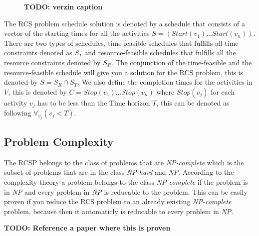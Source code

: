\documentclass{article}
\newcommand{\TODO}[1]{{\color{red}\textbf{TODO: #1}}}
\newcommand{\start}[1]{\textit{Start}(#1)} %
\begin{document}
\begin{figure}[h]
	\centering
	
	\caption{\TODO{verzin caption}}
	\label{fig:time_schedule}
\end{figure}

The RCS problem schedule solution is denoted by a schedule that consists of a vector of the starting times for all the activities $S =  (\start{v_1} \ldots \start{v_n})$.
There are two types of schedules, time-feasible schedules that fulfills all time constraints denoted as $S_T$ and resource-feasible schedules that fulfills all the resource constraints denoted by $S_R$.
The conjunction of the time-feasible and the resource-feasible schedule will give you a solution for the RCS problem, this is denoted by $S = S_R \cap S_T$.
We also define the completion times for the activities in $V$, this is denoted by $C = Stop(v_1) \ldots Stop(v_n)$ where $Stop(v_j)$ for each activity $v_j$ has to be less than the Time horizon $T$, this can be denoted as following $\forall_{v_j}(v_j < T)$.

\subsection{Problem Complexity}
The RCSP belongs to the class of problems that are \emph{NP-complete} which is the subset of problems that are in the class \emph{NP-hard} and \emph{NP}. 
According to the complexity theory a problem belongs to the class \emph{NP-complete} if the problem is in \emph{NP} and every problem in \emph{NP} is reducable to the problem.
This can be easily proven if you reduce the RCS problem to an already existing \emph{NP-complete} problem, because then it automaticly is reducable to every problem in \emph{NP}.

\TODO{Reference a paper where this is proven}
\end{document}
